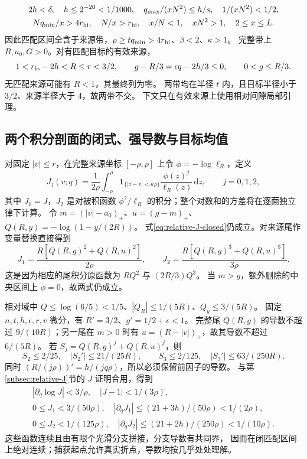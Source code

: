 \documentclass[UTF8,a4paper,11pt,fontset=fandol]{ctexart}
\theoremstyle{remark}
\newcommand{\one}{\mathbf 1}
\newcommand{\dint}{\,\mathrm d}
\begin{document}
\begin{equation}\label{eq:cantelli-geometry}
\begin{gathered}
 2h<\delta,\quad h\le2^{-20}<1/1000,\quad
 q_{\max}/(xN^2)\le h/s,\quad1/(xN^2)<1/2,\\
 Nq_{\min}/x>4r_{\rm hi},\quad N/x>r_{\rm hi},\quad
 x/N<1,\quad xN^2>1,\quad2\le x\le L.
\end{gathered}
\end{equation}
因此匹配区间全含于来源带，$\rho\ge tq_{\min}>4r_{\rm hi}$、$\beta<2$、$\kappa>1$。
完整带上 $R,a_0,G>0$。对有匹配目标的有效来源，
\[
 1<r_{\rm lo}-2h<R\le r<3/2,\qquad
 g-R/3=\epsilon q-2h/3\le0,\qquad0<g\le R/3.
\]
无匹配来源可能有 $R<1$，其最终列为零。
两带均在半径 $t$ 内，且目标半径小于 $3/2$、来源半径大于 $4$，故两带不交。
下文只在有效来源上使用相对间隙局部引理。

\subsection{两个积分剖面的闭式、强导数与目标均值}\label{subsec:cantelli-profiles}
对固定 $|v|\le r$，在完整来源坐标 $[-\rho,\rho]$ 上令 $\phi=-\log\ell_R$，定义
\[
 J_j(v;q)=\frac1{2\rho}\int_{-\rho}^{\rho}
 \one_{\{|z-v|<\kappa\rho\}}\frac{\phi(z)^j}{\ell_R(z)}\dint z,
 \qquad j=0,1,2,
\]
其中 $J_0=J$，$J_2$ 是对被积函数 $\phi^2/\ell_R$ 的积分；整个对数和的方差将在逐面独立律下计算。
令 $m=(|v|-a_0)_+$、$u=(g-m)_+$、$Q(R,y)=-\log(1-y/(2R))$。
式\eqref{eq:relative-J-closed}仍成立。对来源尾作变量替换直接得到
\begin{equation}\label{eq:cantelli-profile-closed}
 J_1=\frac{R[Q(R,g)^2+Q(R,u)^2]}{2\rho},\qquad
 J_2=\frac{R[Q(R,g)^3+Q(R,u)^3]}{3\rho}.
\end{equation}
这是因为相应的尾积分原函数为 $RQ^2$ 与 $(2R/3)Q^3$。
当 $m>g$，额外删除的中央区间上 $\phi=0$，故两式仍成立。

相对域中 $Q\le\log(6/5)<1/5$、$|Q_R|\le1/(5R)$、$Q_y\le3/(5R)$。
固定 $n,t,h,\epsilon,r,v$ 微分，有 $R'=3/2$、$g'=1/2+\epsilon<1$。
完整尾 $Q(R,g)$ 的导数不超过 $9/(10R)$；另一尾在 $m>0$ 时有
$u=(R-|v|)_+$，故其导数不超过 $6/(5R)$。
若 $S_j=Q(R,g)^j+Q(R,u)^j$，则
\[
 S_2\le2/25,\quad |S_2'|\le21/(25R),\qquad
 S_3\le2/125,\quad |S_3'|\le63/(250R).
\]
同时 $(R/(j\rho))'=h/(jq\rho)$，所以必须保留前因子的导数。
与第\ref{subsec:relative-J}节的 $J$ 证明合用，得到
\begin{equation}\label{eq:cantelli-strong}
\begin{gathered}
 |\partial_q\log J|<3/\rho,\quad |J-1|<1/(3\rho),\\
 0\le J_1<3/(50\rho),\quad
 |\partial_qJ_1|\le(21+3h)/(50\rho)<1/(2\rho),\\
 0\le J_2<1/(125\rho),\quad
 |\partial_qJ_2|\le(21+2h)/(250\rho)<1/(10\rho).
\end{gathered}
\end{equation}
这些函数连续且由有限个光滑分支拼接，分支导数有共同界，
因而在闭匹配区间上绝对连续；捕获起点允许真实折点，导数均按几乎处处理解。
\end{document}
